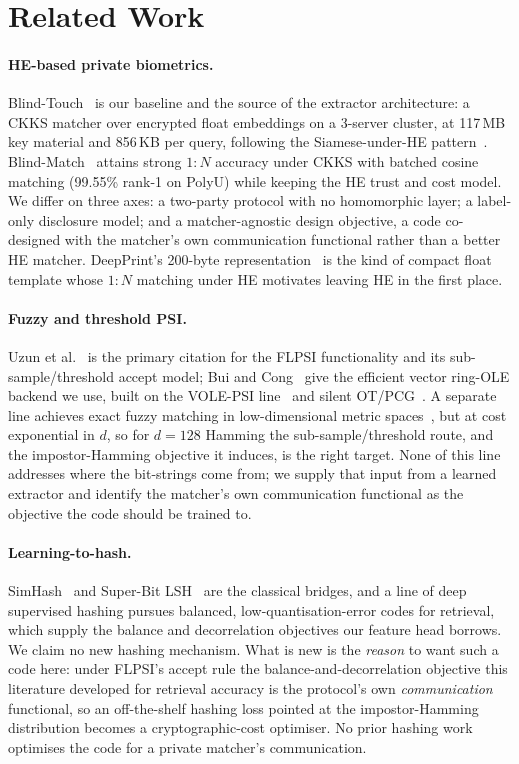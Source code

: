 \section{Related Work}
\label{sec:related}

\paragraph{HE-based private biometrics.} Blind-Touch~\cite{ChoiWooKim24} is our baseline and the source
of the extractor architecture: a CKKS matcher over encrypted float embeddings on a 3-server cluster, at
117\,MB key material and 856\,KB per query, following the Siamese-under-HE
pattern~\cite{KimOhKim20}. Blind-Match~\cite{BlindMatch24} attains strong $1{:}N$ accuracy
under CKKS with batched cosine matching (99.55\% rank-1 on PolyU) while keeping the HE trust and cost
model. We differ on three axes: a two-party protocol with no homomorphic layer; a label-only
disclosure model; and a matcher-agnostic design objective, a code co-designed with the matcher's own
communication functional rather than a better HE matcher. DeepPrint's 200-byte
representation~\cite{EngelsmaCaoJain19} is the kind of compact float template whose $1{:}N$ matching
under HE motivates leaving HE in the first place.

\paragraph{Fuzzy and threshold PSI.} Uzun et al.~\cite{UzunEtAl21} is the primary citation for the FLPSI
functionality and its sub-sample/threshold accept model; Bui and Cong~\cite{BuiCong25} give the
efficient vector ring-OLE backend we use, built on the VOLE-PSI
line~\cite{RindalSchoppmann21} and silent OT/PCG~\cite{BoyleEtAl19}. A separate line
achieves exact fuzzy matching in low-dimensional metric
spaces~\cite{vanBaarsenPu24}, but at cost exponential in
$d$, so for $d=128$ Hamming the sub-sample/threshold route, and the impostor-Hamming objective it
induces, is the right target. None of this line addresses where the bit-strings come from; we supply
that input from a learned extractor and identify the matcher's own communication functional as the
objective the code should be trained to.

\paragraph{Learning-to-hash.} SimHash~\cite{Charikar02} and Super-Bit LSH~\cite{JiEtAl12} are the
classical bridges, and a line of deep supervised hashing pursues balanced, low-quantisation-error codes
for retrieval, which supply the balance and decorrelation objectives our feature head borrows. We claim no new hashing mechanism. What
is new is the \emph{reason} to want such a code here: under FLPSI's accept rule the
balance-and-decorrelation objective this literature developed for retrieval accuracy is the protocol's
own \emph{communication} functional, so an off-the-shelf hashing loss pointed at the impostor-Hamming
distribution becomes a cryptographic-cost optimiser. No prior hashing work optimises the code for a
private matcher's communication.

